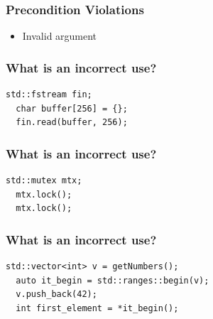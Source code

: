 \documentclass[aspectratio=169]{beamer}
\begin{document}
\begin{frame}
  \frametitle{Precondition Violations}
  
  \begin{itemize}
    \item Invalid argument
  \end{itemize}
\end{frame}

\begin{frame}[fragile]
  \frametitle{What is an incorrect use?}
  
  \begin{lstlisting}[style=cpp20]
  std::fstream fin;
  char buffer[256] = {};
  fin.read(buffer, 256);
  \end{lstlisting}
  
\end{frame}

\begin{frame}[fragile]
  \frametitle{What is an incorrect use?}
  
  \begin{lstlisting}[style=cpp20]
  std::mutex mtx;
  mtx.lock();
  mtx.lock();
  \end{lstlisting}
  
\end{frame}

\begin{frame}[fragile]
  \frametitle{What is an incorrect use?}
  
  \begin{lstlisting}[style=cpp20]
  std::vector<int> v = getNumbers();
  auto it_begin = std::ranges::begin(v);
  v.push_back(42);
  int first_element = *it_begin();
  \end{lstlisting}
  
\end{frame}
\end{document}
